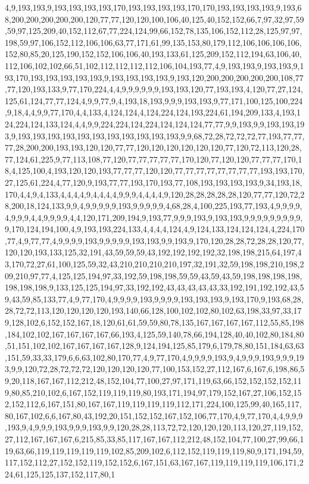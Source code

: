4,9,193,193,9,193,193,193,193,170,193,193,193,193,170,170,193,193,193,193,9,193,68,200,200,200,200,200,120,77,77,120,120,100,106,40,125,40,152,152,66,7,97,32,97,59,59,97,125,209,40,152,112,67,77,224,124,99,66,152,78,135,106,152,112,28,125,97,97,198,59,97,106,152,112,106,106,63,77,171,61,99,135,153,80,179,112,106,106,106,106,152,80,85,20,125,190,152,152,106,106,40,193,133,61,125,209,152,112,194,63,106,40,112,106,102,102,66,51,102,112,112,112,112,106,104,193,77,4,9,193,193,9,193,193,9,193,170,193,193,193,193,193,9,193,193,193,193,9,193,120,200,200,200,200,200,108,77,77,120,193,133,9,77,170,224,4,4,9,9,9,9,9,9,193,193,120,77,193,193,4,120,77,27,124,125,61,124,77,77,124,4,9,9,77,9,4,193,18,193,9,9,9,193,193,9,77,171,100,125,100,224,9,18,4,4,9,9,77,170,4,4,133,4,124,124,4,124,224,124,193,224,61,194,209,133,4,193,124,224,124,133,124,4,4,9,9,224,224,124,224,124,124,124,77,77,9,9,193,9,9,193,193,193,9,193,193,193,193,193,193,193,193,193,193,193,9,9,68,72,28,72,72,72,77,193,77,77,77,28,200,200,193,193,120,120,77,77,120,120,120,120,120,120,77,120,72,113,120,28,77,124,61,225,9,77,113,108,77,120,77,77,77,77,77,170,120,77,120,120,77,77,77,170,18,4,125,100,4,193,120,120,193,77,77,77,120,120,77,77,77,77,77,77,77,77,193,193,170,27,125,61,224,4,77,120,9,193,77,77,193,170,193,77,108,193,193,193,193,9,34,193,18,170,4,4,9,4,133,4,4,4,4,9,4,4,4,4,9,9,9,4,4,4,4,9,120,28,28,28,28,28,120,77,77,120,72,28,200,18,124,133,9,9,4,9,9,9,9,9,193,9,9,9,9,9,4,68,28,4,100,225,193,77,193,4,9,9,9,9,4,9,9,9,4,4,9,9,9,9,4,4,120,171,209,194,9,193,77,9,9,9,193,9,193,193,9,9,9,9,9,9,9,9,9,9,170,124,194,100,4,9,193,193,224,133,4,4,4,4,124,4,9,124,133,124,124,124,4,224,170,77,4,9,77,77,4,9,9,9,9,193,9,9,9,9,9,193,193,9,9,193,9,170,120,28,28,72,28,28,120,77,120,120,193,133,125,32,191,43,59,59,59,43,192,192,192,192,32,198,198,215,64,197,43,170,72,27,61,100,125,59,32,43,210,210,210,210,197,32,191,32,59,198,198,210,198,209,210,97,77,4,125,125,194,97,33,192,59,198,198,59,59,43,59,43,59,198,198,198,198,198,198,198,9,133,125,125,194,97,33,192,192,43,43,43,43,43,33,192,191,192,192,43,59,43,59,85,133,77,4,9,77,170,4,9,9,9,9,193,9,9,9,9,193,193,193,9,193,170,9,193,68,28,28,72,72,113,120,120,120,120,193,140,66,128,100,102,102,80,102,63,198,33,97,33,179,128,102,6,152,152,167,18,120,61,61,59,59,80,78,135,167,167,167,167,112,55,85,198,184,102,102,167,167,167,167,66,193,4,125,59,140,78,66,194,128,40,40,102,80,184,80,51,151,102,102,167,167,167,167,128,9,124,194,125,85,179,6,179,78,80,151,184,63,63,151,59,33,33,179,6,6,63,102,80,170,77,4,9,77,170,4,9,9,9,9,193,9,4,9,9,9,193,9,9,9,193,9,9,120,72,28,72,72,72,120,120,120,120,77,100,153,152,27,112,167,6,167,6,198,86,59,20,118,167,167,112,212,48,152,104,77,100,27,97,171,119,63,66,152,152,152,152,119,80,85,210,102,6,167,152,119,119,119,80,193,171,194,97,179,152,167,27,106,152,152,152,112,6,167,151,80,167,167,119,119,119,119,112,171,224,100,125,99,40,165,117,80,167,102,6,6,167,80,43,192,20,151,152,152,167,152,106,77,170,4,9,77,170,4,4,9,9,9,193,9,4,9,9,9,193,9,9,9,193,9,9,120,28,28,113,72,72,120,120,120,113,120,27,119,152,27,112,167,167,167,6,215,85,33,85,117,167,167,112,212,48,152,104,77,100,27,99,66,119,63,66,119,119,119,119,119,102,85,209,102,6,112,152,119,119,119,80,9,171,194,59,117,152,112,27,152,152,119,152,152,6,167,151,63,167,167,119,119,119,119,106,171,224,61,125,125,137,152,117,80,1